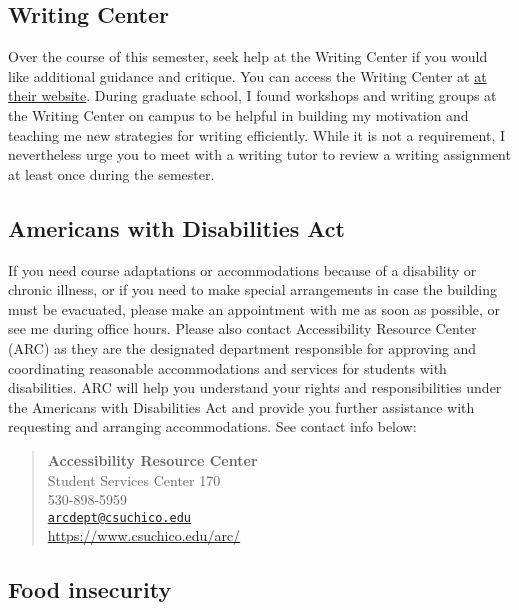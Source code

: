 \documentclass[11pt,]{article}
\begin{document}
\hypertarget{writing-center}{%
\subsection{Writing Center}\label{writing-center}}

Over the course of this semester, seek help at the Writing Center if you
would like additional guidance and critique. You can access the Writing
Center at
\href{https://www.csuchico.edu/slc/writing-center/index.shtml}{at their
website}. During graduate school, I found workshops and writing groups
at the Writing Center on campus to be helpful in building my motivation
and teaching me new strategies for writing efficiently. While it is not
a requirement, I nevertheless urge you to meet with a writing tutor to
review a writing assignment at least once during the semester.

\hypertarget{americans-with-disabilities-act}{%
\subsection{Americans with Disabilities
Act}\label{americans-with-disabilities-act}}

If you need course adaptations or accommodations because of a disability
or chronic illness, or if you need to make special arrangements in case
the building must be evacuated, please make an appointment with me as
soon as possible, or see me during office hours. Please also contact
Accessibility Resource Center (ARC) as they are the designated
department responsible for approving and coordinating reasonable
accommodations and services for students with disabilities. ARC will
help you understand your rights and responsibilities under the Americans
with Disabilities Act and provide you further assistance with requesting
and arranging accommodations. See contact info below:

\begin{quote}
\textbf{Accessibility Resource Center}\\
Student Services Center 170\\
530-898-5959\\
\href{mailto:arcdept@csuchico.edu}{\nolinkurl{arcdept@csuchico.edu}}\\
\url{https://www.csuchico.edu/arc/}
\end{quote}

\hypertarget{food-insecurity}{%
\subsection{Food insecurity}\label{food-insecurity}}
\end{document}
